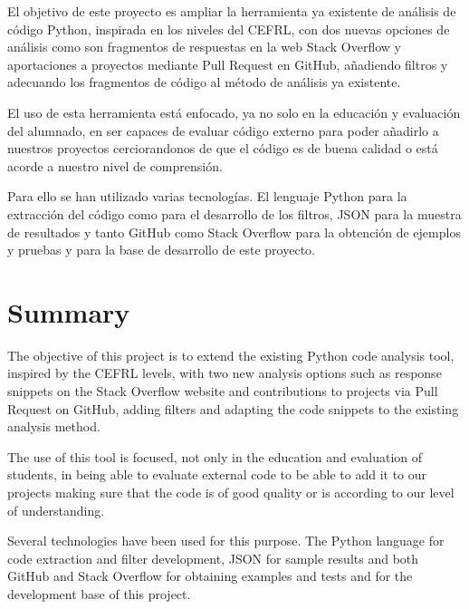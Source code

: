 \documentclass[a4paper, 12pt]{book}
\begin{document}
El objetivo de este proyecto es ampliar la herramienta ya existente de análisis de código Python, inspirada en los niveles del CEFRL, con dos nuevas opciones de análisis como son fragmentos de respuestas en la web Stack Overflow y aportaciones a proyectos mediante Pull Request en GitHub, añadiendo filtros y adecuando los fragmentos de código al método de análisis ya existente.

El uso de esta herramienta está enfocado, ya no solo en la educación y evaluación del alumnado, en ser capaces de evaluar código externo para poder añadirlo a nuestros proyectos cerciorandonos de que el código es de buena calidad o está acorde a nuestro nivel de comprensión.

Para ello se han utilizado varias tecnologías. El lenguaje Python para la extracción del código como para el desarrollo de los filtros, JSON para la muestra de resultados y tanto GitHub como Stack Overflow para la obtención de ejemplos y pruebas y para la base de desarrollo de este proyecto.


\chapter*{Summary}

The objective of this project is to extend the existing Python code analysis tool, inspired by the CEFRL levels, with two new analysis options such as response snippets on the Stack Overflow website and contributions to projects via Pull Request on GitHub, adding filters and adapting the code snippets to the existing analysis method.

The use of this tool is focused, not only in the education and evaluation of students, in being able to evaluate external code to be able to add it to our projects making sure that the code is of good quality or is according to our level of understanding.

Several technologies have been used for this purpose. The Python language for code extraction and filter development, JSON for sample results and both GitHub and Stack Overflow for obtaining examples and tests and for the development base of this project.


\end{document}
